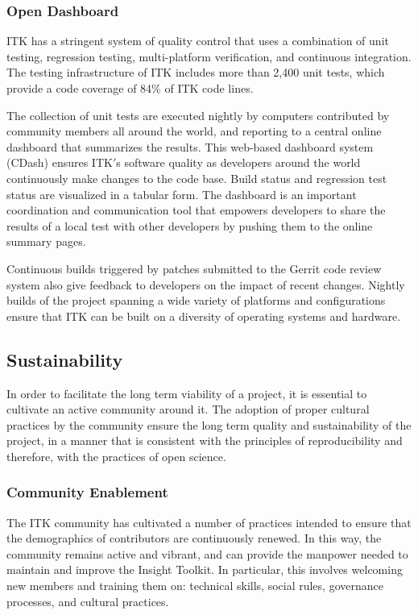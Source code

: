 \documentclass{frontiersENG} %
\begin{document}
\subsubsection{Open Dashboard}

ITK has a stringent system of quality control
that uses a combination of unit testing, regression testing, multi-platform
verification, and continuous integration. The testing infrastructure of ITK
includes more than 2,400 unit tests, which provide a code coverage of 84\% of
ITK code lines.

The collection of unit tests are executed nightly by computers contributed by
community members all around the world, and reporting to a central online
dashboard that summarizes the results. This web-based dashboard system (CDash)
 \cite{ITKDashboard} ensures ITK$'$s software quality as developers around the
world continuously make changes to the code base. Build status and regression
test status are visualized in a tabular form. The dashboard is an important
coordination and communication tool that empowers developers to share the
results of a local test with other developers by pushing them to the online
summary pages.

Continuous builds triggered by patches submitted to the Gerrit code review
system also give feedback to developers on the impact of recent changes.
Nightly builds of the project spanning a wide variety of platforms and
configurations ensure that ITK can be built on a diversity of operating systems
and hardware.


\subsection{Sustainability}

In order to facilitate the long term viability of a project, it is essential to
cultivate an active community around it. The adoption of proper cultural
practices by the community ensure the long term quality and sustainability of
the project, in a manner that is consistent with the principles of
reproducibility and therefore, with the practices of open science.

\subsubsection{Community Enablement}

The ITK community has cultivated a number of practices intended to ensure that
the demographics of contributors are continuously renewed. In this way, the
community remains active and vibrant, and can provide the manpower needed to
maintain and improve the Insight Toolkit. In particular, this involves welcoming
new members and training them on:  technical skills, social rules, governance
processes, and cultural practices.
\end{document}
